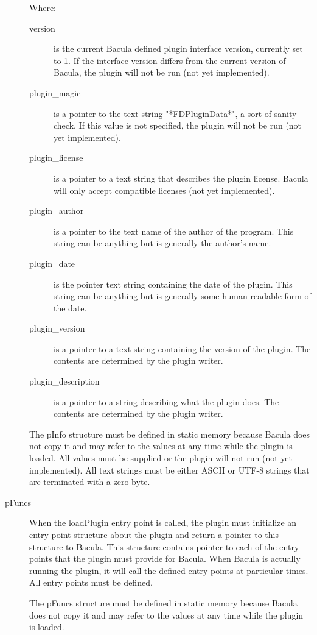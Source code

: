 \begin{description}
Where:
 \begin{description}
 \item [version] is the current Bacula defined plugin interface version, currently
   set to 1. If the interface version differs from the current version of 
   Bacula, the plugin will not be run (not yet implemented).
 \item [plugin\_magic] is a pointer to the text string "*FDPluginData*", a
   sort of sanity check.  If this value is not specified, the plugin
   will not be run (not yet implemented).
 \item [plugin\_license] is a pointer to a text string that describes the
   plugin license. Bacula will only accept compatible licenses (not yet
   implemented).
 \item [plugin\_author] is a pointer to the text name of the author of the program.
   This string can be anything but is generally the author's name.
 \item [plugin\_date] is the pointer text string containing the date of the plugin.
   This string can be anything but is generally some human readable form of 
   the date.
 \item [plugin\_version] is a pointer to a text string containing the version of
   the plugin.  The contents are determined by the plugin writer.
 \item [plugin\_description] is a pointer to a string describing what the
   plugin does. The contents are determined by the plugin writer.
 \end{description}

The pInfo structure must be defined in static memory because Bacula does not
copy it and may refer to the values at any time while the plugin is
loaded. All values must be supplied or the plugin will not run (not yet
implemented).  All text strings must be either ASCII or UTF-8 strings that
are terminated with a zero byte.

\item [pFuncs]
When the loadPlugin entry point is called, the plugin must initialize
an entry point structure about the plugin and return a pointer to
this structure to Bacula. This structure contains pointer to each
of the entry points that the plugin must provide for Bacula. When
Bacula is actually running the plugin, it will call the defined
entry points at particular times.  All entry points must be defined.

The pFuncs structure must be defined in static memory because Bacula does not
copy it and may refer to the values at any time while the plugin is
loaded.


\end{description}
